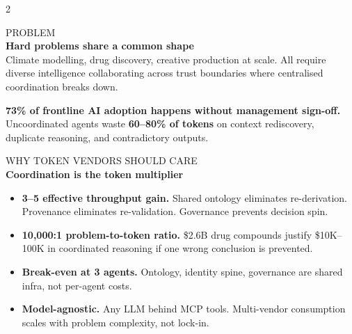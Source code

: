 \documentclass[10pt,a4paper]{article}
\newcommand{\sectiontag}[1]{%
  \vspace{3pt}%
  {\scriptsize\color{gold}\MakeUppercase{#1}}\\[-2pt]%
}
\begin{document}
\vspace{2pt}
\begin{multicols}{2}
\raggedright
{}

\sectiontag{Problem}
{\small\bfseries Hard problems share a common shape}\\[1pt]
{\scriptsize Climate modelling, drug discovery, creative production at scale. All require diverse intelligence collaborating across trust boundaries where centralised coordination breaks down.}

\vspace{1pt}
{\scriptsize\color{crimson}\bfseries 73\% of frontline AI adoption happens without management sign-off.} {\scriptsize\color{textmuted}Uncoordinated agents waste \textbf{60--80\% of tokens} on context rediscovery, duplicate reasoning, and contradictory outputs.}

\vspace{4pt}

\sectiontag{Why Token Vendors Should Care}
{\small\bfseries Coordination is the token multiplier}\\[1pt]

\begin{itemize}[leftmargin=8pt,itemsep=0pt,parsep=0pt,topsep=1pt,label={}]
  \item {\color{cyan}\textbullet} {\scriptsize\bfseries 3--5\texttimes{} effective throughput gain.} {\scriptsize\color{textmuted}Shared ontology eliminates re-derivation. Provenance eliminates re-validation. Governance prevents decision spin.}
  \item {\color{emerald}\textbullet} {\scriptsize\bfseries 10,000:1 problem-to-token ratio.} {\scriptsize\color{textmuted}\$2.6B drug compounds justify \$10K--100K in coordinated reasoning if one wrong conclusion is prevented.}
  \item {\color{gold}\textbullet} {\scriptsize\bfseries Break-even at 3 agents.} {\scriptsize\color{textmuted}Ontology, identity spine, governance are shared infra, not per-agent costs.}
  \item {\color{purple}\textbullet} {\scriptsize\bfseries Model-agnostic.} {\scriptsize\color{textmuted}Any LLM behind MCP tools. Multi-vendor consumption scales with problem complexity, not lock-in.}
\end{itemize}

\vspace{4pt}


\end{multicols}
\end{document}
